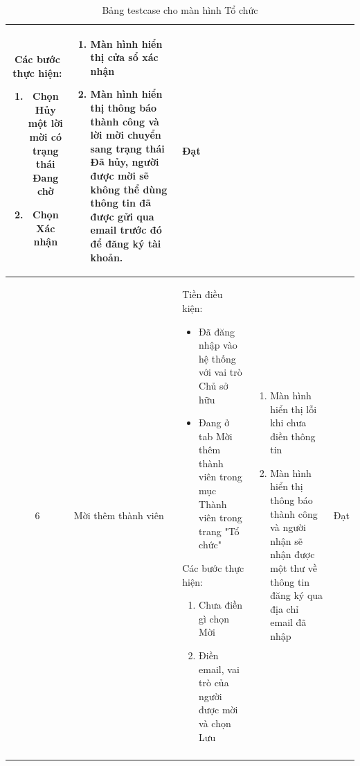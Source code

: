 \begin{longtable}{|c|m{2.5cm}|m{5.5cm}|m{4.5cm}|c|}
\begin{itemize}
    \end{itemize}
    Các bước thực hiện: 
    \begin{enumerate}[label=\arabic*.]
        \item Chọn Hủy một lời mời có trạng thái Đang chờ
        \item Chọn Xác nhận
    \end{enumerate}
    & 
    \begin{enumerate}[label=\arabic*.]
        \item Màn hình hiển thị cửa sổ xác nhận
        \item Màn hình hiển thị thông báo thành công và lời mời chuyển sang trạng thái Đã hủy, người được mời sẽ không thể dùng thông tin đã được gửi qua email trước đó để đăng ký tài khoản.
    \end{enumerate}  & Đạt \\
    \hline
    6 & 
    Mời thêm thành viên & 
    Tiền điều kiện:
    \begin{itemize}
        \item Đã đăng nhập vào hệ thống với vai trò Chủ sở hữu
        \item Đang ở tab Mời thêm thành viên trong mục Thành viên trong trang "Tổ chức"
    \end{itemize}
    Các bước thực hiện: 
    \begin{enumerate}[label=\arabic*.]
        \item Chưa điền gì chọn Mời
        \item Điền email, vai trò của người được mời và chọn Lưu
    \end{enumerate}
    & 
    \begin{enumerate}[label=\arabic*.]
        \item Màn hình hiển thị lỗi khi chưa điền thông tin
        \item Màn hình hiển thị thông báo thành công và người nhận sẽ nhận được một thư về thông tin đăng ký qua địa chỉ email đã nhập
    \end{enumerate}  & Đạt \\
    \hline
    \caption{Bảng testcase cho màn hình Tổ chức}
\end{longtable}